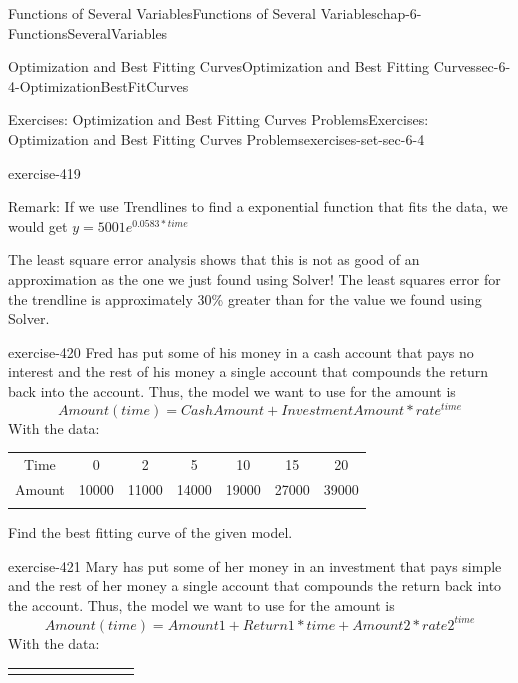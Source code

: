 \documentclass[oneside,10pt,]{book}
\numberwithin{equation}{section}
\newcommand{\hrulethin}  {\noalign{\hrule height 0.04em}}
\newcommand{\hrulethick} {\noalign{\hrule height 0.11em}}
\begin{document}
\begin{chapterptx}{Functions of Several Variables}{}{Functions of Several Variables}{}{}{chap-6-FunctionsSeveralVariables}
\begin{sectionptx}{Optimization and Best Fitting Curves}{}{Optimization and Best Fitting Curves}{}{}{sec-6-4-OptimizationBestFitCurves}
\begin{exercises-subsection-numberless}{Exercises: Optimization and Best Fitting Curves Problems}{}{Exercises: Optimization and Best Fitting Curves Problems}{}{}{exercises-set-sec-6-4}
\begin{divisionexercise}{5}{}{}{exercise-419}
\par
\hypertarget{p-2512}{}%
Remark: If we use Trendlines to find a exponential function that fits the data, we would get \(y=5001 e^{0.0583*time}\)%
\par
\hypertarget{p-2513}{}%
The least square error analysis shows that this is not as good of an approximation as the one we just found using Solver! The least squares error for the trendline is approximately 30\% greater than for the value we found using Solver.%
\end{divisionexercise}%
\begin{divisionexercise}{6}{}{}{exercise-420}%
\hypertarget{p-2514}{}%
Fred has put some of his money in a cash account that pays no interest and the rest of his money a single account that compounds the return back into the account.  Thus, the model we want to use for the amount is%
%
\begin{equation*}
Amount(time)=CashAmount+InvestmentAmount*rate^{time}
\end{equation*}
\hypertarget{p-2515}{}%
With the data:%
\begin{sidebyside}{1}{0}{0}{0}%
\begin{sbspanel}{1}%
{\centering%
\begin{tabular}{ccccccc}\hrulethick
Time&0&2&5&10&15&20\tabularnewline\hrulethin
Amount&\textdollar{}10000&\textdollar{}11000&\textdollar{}14000&\textdollar{}19000&\textdollar{}27000&\textdollar{}39000\tabularnewline\hrulethin
\end{tabular}
\par}
\end{sbspanel}%
\end{sidebyside}%
\par
\hypertarget{p-2516}{}%
Find the best fitting curve of the given model.%
\end{divisionexercise}%
\begin{divisionexercise}{7}{}{}{exercise-421}%
\hypertarget{p-2517}{}%
Mary has put some of her money in an investment that pays simple and the rest of her money a single account that compounds the return back into the account.  Thus, the model we want to use for the amount is%
%
\begin{equation*}
Amount(time)=Amount1+Return1*time+Amount2*rate2^{time}
\end{equation*}
\hypertarget{p-2518}{}%
With the data:%
\begin{sidebyside}{1}{0}{0}{0}%
\begin{sbspanel}{1}%
{\centering%
\begin{tabular}{ccccccccc}\hrulethick

\end{tabular}}
\end{sbspanel}
\end{sidebyside}
\end{divisionexercise}
\end{exercises-subsection-numberless}
\end{sectionptx}
\end{chapterptx}
\end{document}
